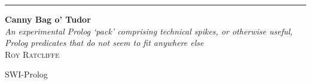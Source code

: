 \documentclass[11pt]{report}
\begin{document}
\begin{titlepage}
    \raggedleft
    \rule{1pt}{\textheight}
    \hspace{0.05\textwidth}
    \parbox[b]{0.75\textwidth}{
        {\Huge\bfseries Canny Bag o' Tudor}
        \\[2\baselineskip]
        {\large\textit{An experimental Prolog `pack' comprising technical spikes, or
        otherwise useful, Prolog predicates that do not seem to fit anywhere else}}
        \\[4\baselineskip]
        {\Large\textsc{Roy Ratcliffe}}

        \vspace{0.5\textheight}
        {\noindent SWI-Prolog}\\[\baselineskip]
    }
\end{titlepage}
\tableofcontents


\printindex
\end{document}
